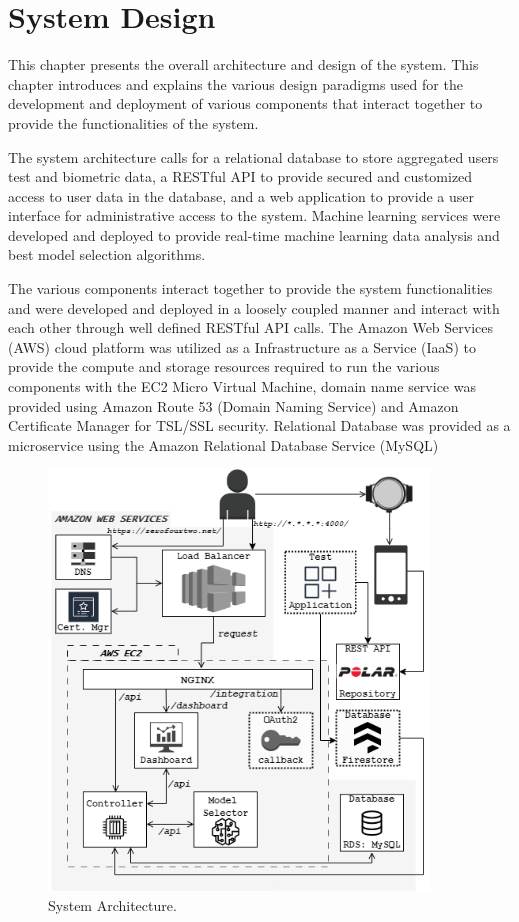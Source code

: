 \chapter{System Design}

This chapter presents the overall architecture and design of the system. This chapter introduces and explains the various design 
paradigms used for the development and deployment of various components that interact together to provide the functionalities of the system. 

The system architecture calls for a relational database to store aggregated users test and biometric data, a RESTful API to provide secured 
and customized access to user data in the database, and a web application to provide a user interface for administrative access to the 
system. Machine learning services were developed and deployed to provide real-time machine learning data analysis and best model selection 
algorithms.

The various components interact together to provide the system functionalities and were developed and deployed in a loosely coupled manner and
interact with each other through well defined RESTful API calls.  The Amazon Web Services (AWS) cloud platform was utilized as a Infrastructure
as a Service (IaaS) to provide the compute and storage resources required to run the various components with the EC2 Micro Virtual Machine, 
domain name service was provided using Amazon Route 53 (Domain Naming Service) and Amazon Certificate Manager for TSL/SSL security. Relational 
Database was provided as a microservice using the Amazon Relational Database Service (MySQL)

\begin{figure}[h!]
    \includegraphics[width=0.9\textwidth]{images/sys_architecture.png}
    \caption{System Architecture.}
    \label{image:sys_architecture}
\end{figure}

